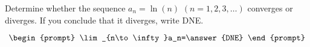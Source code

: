 \documentclass{ximera}
\author{Gregory Hartman \and Matthew Carr}
\begin{document}
\begin{exercise}



Determine whether the sequence $a_n=\ln(n)$ $(n=1,2,3,\ldots)$ converges or diverges. If you conclude that it diverges, write DNE.

\[
\begin{prompt}
\lim_{n\to\infty}a_n=\answer{DNE}
\end{prompt}
\]


\end{exercise}
\end{document}
